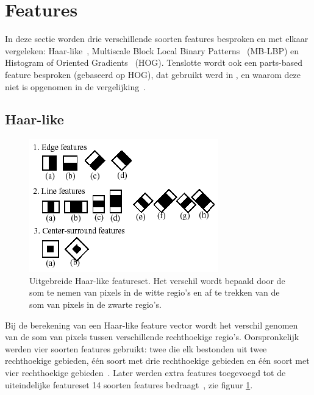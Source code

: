 \section{Features} \label{sec:feat}

In deze sectie worden drie verschillende soorten features besproken en met elkaar vergeleken: Haar-like~\cite{viola2001rapid}, Multiscale Block Local Binary Patterns~\cite{liao2007learning} (MB-LBP) en Histogram of Oriented Gradients~\cite{dalal2005histograms} (HOG). Tenslotte wordt ook een parts-based feature besproken (gebaseerd op HOG), dat gebruikt werd in \cite{aubry2014seeing}, en waarom deze niet is opgenomen in de vergelijking~\cite{felzenszwalb2010object}.



\subsection{Haar-like} \label{sec:feat_haarlike}

\begin{figure}
  \centering
  \includegraphics[width=.7\linewidth]{img/haar2}
  \caption{Uitgebreide Haar-like featureset. Het verschil wordt bepaald door de som te nemen van pixels in de witte regio's en af te trekken van de som van pixels in de zwarte regio's.}
  \label{fig:haarUitg}
\end{figure}

Bij de berekening van een Haar-like feature vector wordt het verschil genomen van de som van pixels tussen verschillende rechthoekige regio's. Oorspronkelijk werden vier soorten features gebruikt: twee die elk bestonden uit twee rechthoekige gebieden, \'e\'en soort met drie rechthoekige gebieden en \'e\'en soort met vier rechthoekige gebieden~\cite{viola2001rapid}. Later werden extra features toegevoegd tot de uiteindelijke featureset 14 soorten features bedraagt~\cite{lienhart2002extended}, zie figuur \ref{fig:haarUitg}.

